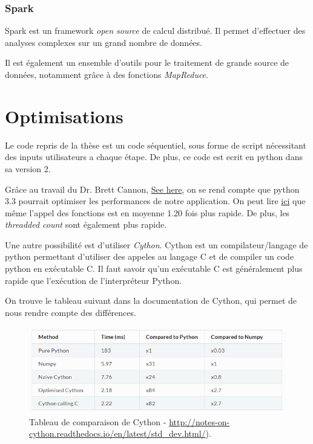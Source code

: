 \subsubsection{Spark}
Spark est un framework \emph{open source} de calcul distribué. Il permet d'effectuer des analyses complexes sur un grand nombre de données.

Il est également un ensemble d'outils pour le traitement de grande source de données, notamment grâce à des fonctions \emph{MapReduce}.
	
\section{Optimisations}
Le code repris de la thèse \thLeite est un code séquentiel, sous forme de script nécessitant des inputs utilisateurs a chaque étape. De plus, ce code est ecrit en python dans sa version 2.

Grâce au travail du Dr. Brett Cannon, \href{https://speakerdeck.com/pyconslides/python-3-dot-3-trust-me-its-better-than-python-2-dot-7-by-dr-brett-cannon}{See here}, on se rend compte que python 3.3 pourrait optimiser les performances de notre application. On peut lire  \href{https://mail.python.org/pipermail/python-dev/2012-October/121923.html}{ici} que même l'appel des fonctions est en moyenne 1.20 fois plus rapide. De plus, les \emph{threadded count} sont également plus rapide.

Une autre possibilité est d'utiliser \emph{Cython}. Cython est un compilateur/langage de python permettant d'utiliser des appeles au langage C et de compiler un code python en exécutable C. Il faut savoir qu'un exécutable C est généralement plus rapide que l'exécution de l'interpréteur Python. 

On trouve le tableau suivant dans la documentation de Cython, qui permet de nous rendre compte des différences.

\begin{figure}[H] 
\centering 
\includegraphics[width=1\columnwidth]{img/table_cython} 
\caption[Tableau performences Cython]{Tableau de comparaison de Cython - \url{http://notes-on-cython.readthedocs.io/en/latest/std_dev.html/}).}
\label{fig:galleria} 
\end{figure}

